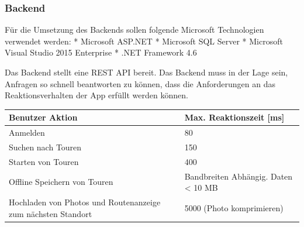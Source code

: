 \documentclass[ngerman,]{article}
\begin{document}
\subsubsection{Backend}\label{backend}

Für die Umsetzung des Backends sollen folgende Microsoft Technologien
verwendet werden: * Microsoft ASP.NET * Microsoft SQL Server * Microsoft
Visual Studio 2015 Enterprise * .NET Framework 4.6

Das Backend stellt eine REST API bereit. Das Backend muss in der Lage
sein, Anfragen so schnell beantworten zu können, dass die Anforderungen
an das Reaktionsverhalten der App erfüllt werden können.

\begin{longtable}[]{@{}ll@{}}
\toprule
\begin{minipage}[b]{0.27\columnwidth}\raggedright\strut
Benutzer Aktion\strut
\end{minipage} & \begin{minipage}[b]{0.29\columnwidth}\raggedright\strut
Max. Reaktionszeit {[}ms{]}\strut
\end{minipage}\tabularnewline
\midrule
\endhead
\begin{minipage}[t]{0.27\columnwidth}\raggedright\strut
Anmelden\strut
\end{minipage} & \begin{minipage}[t]{0.29\columnwidth}\raggedright\strut
80\strut
\end{minipage}\tabularnewline
\begin{minipage}[t]{0.27\columnwidth}\raggedright\strut
Suchen nach Touren\strut
\end{minipage} & \begin{minipage}[t]{0.29\columnwidth}\raggedright\strut
150\strut
\end{minipage}\tabularnewline
\begin{minipage}[t]{0.27\columnwidth}\raggedright\strut
Starten von Touren\strut
\end{minipage} & \begin{minipage}[t]{0.29\columnwidth}\raggedright\strut
400\strut
\end{minipage}\tabularnewline
\begin{minipage}[t]{0.27\columnwidth}\raggedright\strut
Offline Speichern von Touren\strut
\end{minipage} & \begin{minipage}[t]{0.29\columnwidth}\raggedright\strut
Bandbreiten Abhängig. Daten \textless{} 10 MB\strut
\end{minipage}\tabularnewline
\begin{minipage}[t]{0.27\columnwidth}\raggedright\strut
Hochladen von Photos und Routenanzeige zum nächsten Standort\strut
\end{minipage} & \begin{minipage}[t]{0.29\columnwidth}\raggedright\strut
5000 (Photo komprimieren)\strut
\end{minipage}\tabularnewline
\bottomrule
\end{longtable}
\end{document}
